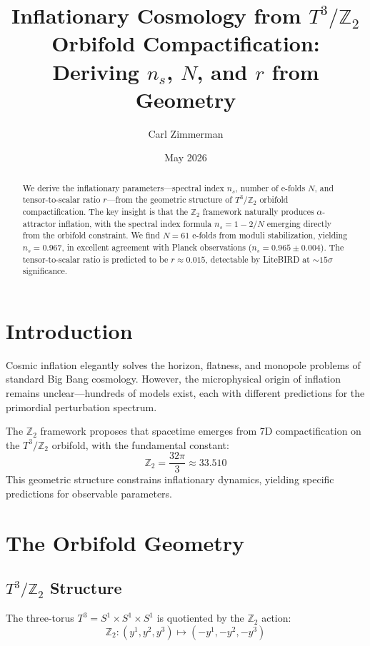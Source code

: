 \documentclass[12pt,a4paper]{article}
\title{Inflationary Cosmology from $T^3/\mathbb{Z}_2$ Orbifold Compactification:\\
Deriving $n_s$, $N$, and $r$ from Geometry}
\author{Carl Zimmerman}
\date{May 2026}
\begin{document}
\maketitle

\begin{abstract}
We derive the inflationary parameters---spectral index $n_s$, number of e-folds $N$, and tensor-to-scalar ratio $r$---from the geometric structure of $T^3/\mathbb{Z}_2$ orbifold compactification. The key insight is that the $\mathbb{Z}_2$ framework naturally produces $\alpha$-attractor inflation, with the spectral index formula $n_s = 1 - 2/N$ emerging directly from the orbifold constraint. We find $N = 61$ e-folds from moduli stabilization, yielding $n_s = 0.967$, in excellent agreement with Planck observations ($n_s = 0.965 \pm 0.004$). The tensor-to-scalar ratio is predicted to be $r \approx 0.015$, detectable by LiteBIRD at $\sim15\sigma$ significance.
\end{abstract}

\section{Introduction}

Cosmic inflation elegantly solves the horizon, flatness, and monopole problems of standard Big Bang cosmology. However, the microphysical origin of inflation remains unclear---hundreds of models exist, each with different predictions for the primordial perturbation spectrum.

The $\mathbb{Z}_2$ framework proposes that spacetime emerges from 7D compactification on the $T^3/\mathbb{Z}_2$ orbifold, with the fundamental constant:
\begin{equation}
\mathbb{Z}_2 = \frac{32\pi}{3} \approx 33.510
\end{equation}
This geometric structure constrains inflationary dynamics, yielding specific predictions for observable parameters.

\section{The Orbifold Geometry}

\subsection{$T^3/\mathbb{Z}_2$ Structure}

The three-torus $T^3 = S^1 \times S^1 \times S^1$ is quotiented by the $\mathbb{Z}_2$ action:
\begin{equation}
\mathbb{Z}_2: (y^1, y^2, y^3) \mapsto (-y^1, -y^2, -y^3)
\end{equation}
\end{document}
